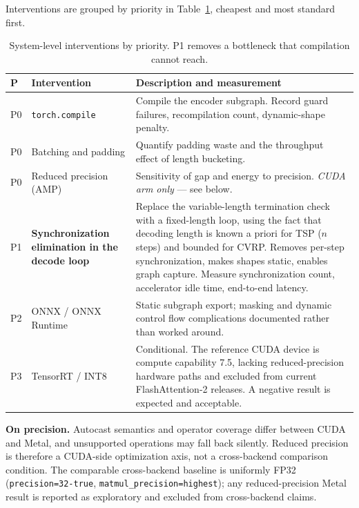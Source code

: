 \documentclass[11pt,a4paper,twocolumn]{article}
\begin{document}
Interventions are grouped by priority in Table~\ref{tab:optimizations}, cheapest
and most standard first.

\begin{table}[t]
\centering
\small
\begin{tabular}{@{}p{}p{}p{}@{}}
\toprule
\textbf{P} & \textbf{Intervention} & \textbf{Description and measurement} \\
\midrule
P0 & \texttt{torch.compile} & Compile the encoder subgraph. Record guard
failures, recompilation count, dynamic-shape penalty. \\
P0 & Batching and padding & Quantify padding waste and the throughput effect of
length bucketing. \\
P0 & Reduced precision (AMP) & Sensitivity of gap and energy to precision.
\emph{CUDA arm only} --- see below. \\
P1 & \textbf{Synchronization elimination in the decode loop} & Replace the
variable-length termination check with a fixed-length loop, using the fact that
decoding length is known a priori for TSP ($n$ steps) and bounded for CVRP. Removes
per-step synchronization, makes shapes static, enables graph capture. Measure
synchronization count, accelerator idle time, end-to-end latency. \\
P2 & ONNX / ONNX Runtime & Static subgraph export; masking and dynamic control
flow complications documented rather than worked around. \\
P3 & TensorRT / INT8 & Conditional. The reference CUDA device is compute
capability 7.5, lacking reduced-precision hardware paths and excluded from current
FlashAttention-2 releases. A negative result is expected and acceptable. \\
\bottomrule
\end{tabular}
\caption{System-level interventions by priority. P1 removes a bottleneck that
compilation cannot reach.}
\label{tab:optimizations}
\end{table}

\textbf{On precision.} Autocast semantics and operator coverage differ between CUDA
and Metal, and unsupported operations may fall back silently. Reduced precision is
therefore a CUDA-side optimization axis, not a cross-backend comparison condition.
The comparable cross-backend baseline is uniformly FP32
(\texttt{precision=32-true}, \texttt{matmul\_precision=highest}); any
reduced-precision Metal result is reported as exploratory and excluded from
cross-backend claims.
\end{document}
